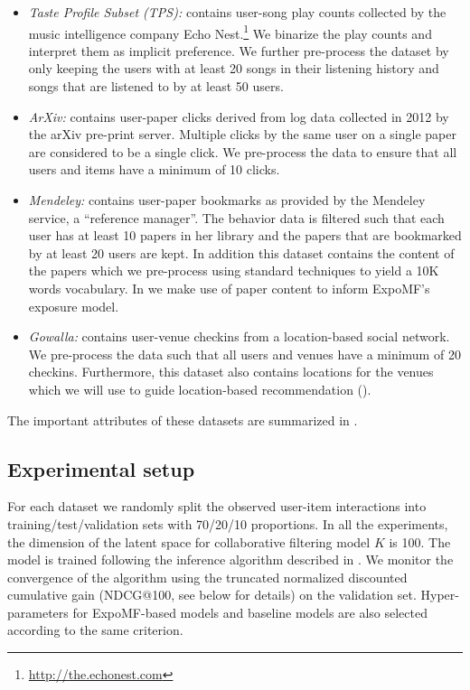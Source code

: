 \begin{itemize}
\item \emph{Taste Profile Subset (TPS):} contains user-song play counts
collected by the music intelligence company Echo
Nest.\footnote{\url{http://the.echonest.com}} We binarize the play counts and
interpret them as implicit preference. We further pre-process the dataset by
only keeping the users with at least 20 songs in their listening history and
songs that are listened to by at least 50 users. 

\item \emph{ArXiv:} contains user-paper clicks derived from log data collected
in 2012 by the arXiv pre-print server. Multiple clicks
by the same user on a single paper are considered to be a single click. We
pre-process the data to ensure that all users and items have a minimum of 10
clicks. 

\item \emph{Mendeley:} contains user-paper bookmarks as provided by 
the Mendeley service, a ``reference
manager''. The behavior data is filtered such that each
user has at least 10 papers in her library and the papers that are bookmarked
by at least 20 users are kept. In addition this dataset contains the
content of the papers which we pre-process using standard techniques to
yield a 10K words vocabulary. In  we make use of paper
content to inform ExpoMF's exposure model.  

\item \emph{Gowalla:} contains user-venue checkins from a location-based social
network. We pre-process the data such that all
users and venues have a minimum of 20 checkins. Furthermore, this dataset
also contains locations for the venues which we will use to guide 
location-based recommendation ().  
\end{itemize}

The important attributes of these datasets are summarized in .

\subsection{Experimental setup} 

For each dataset we randomly split the observed user-item interactions
into training/test/validation sets with 70/20/10 proportions. In all the experiments, the dimension 
of the latent space for collaborative filtering model $K$ is 100. The
model is trained following the inference algorithm described in
. We monitor the convergence of the algorithm using
the truncated normalized discounted cumulative gain ({NDCG@100}, see below for
details) on the validation set. Hyper-parameters for ExpoMF-based models
and baseline models are also selected according to the same criterion.

